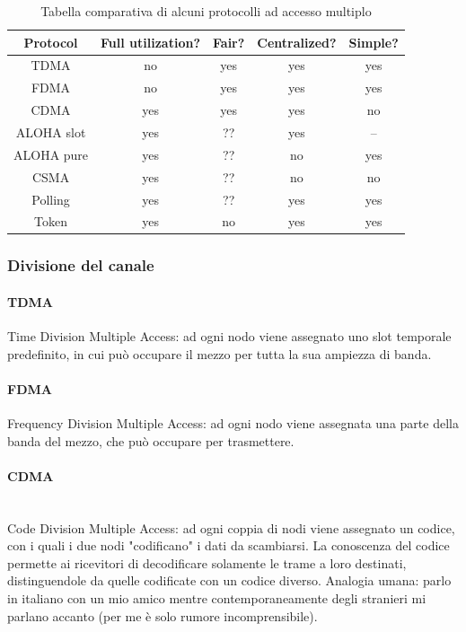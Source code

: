 \documentclass[12pt,a4paper]{article}
\begin{document}
\begin{table}[H]
  \centering
  \begin{tabular}{| c | c | c | c | c |}
  \hline
  Protocol    & Full utilization? & Fair? & Centralized?  & Simple? \\ \hline
  TDMA        & no                & yes   & yes           & yes     \\ \hline
  FDMA        & no                & yes   & yes           & yes     \\ \hline
  CDMA        & yes               & yes   & yes           & no      \\ \hline
  ALOHA slot  & yes               & ??    & yes           & --      \\ \hline
  ALOHA pure  & yes               & ??    & no            & yes     \\ \hline
  CSMA        & yes               & ??    & no            & no      \\ \hline
  Polling     & yes               & ??    & yes           & yes     \\ \hline
  Token       & yes               & no    & yes           & yes     \\ \hline
  \end{tabular}
  \caption{Tabella comparativa di alcuni protocolli ad accesso multiplo}
\end{table}

\subsubsection{Divisione del canale}
\paragraph{TDMA}
  Time Division Multiple Access: ad ogni nodo viene assegnato uno slot
  temporale predefinito, in cui può occupare il mezzo per tutta la sua
  ampiezza di banda.
\paragraph{FDMA}
  Frequency Division Multiple Access: ad ogni nodo viene assegnata una
  parte della banda del mezzo, che può occupare per trasmettere.
\paragraph{CDMA}\mbox{}\\
  Code Division Multiple Access: ad ogni coppia di nodi viene assegnato
  un codice, con i quali i due nodi "codificano" i dati da scambiarsi.
  La conoscenza del codice permette ai ricevitori di decodificare
  solamente le trame a loro destinati, distinguendole da quelle
  codificate con un codice diverso. Analogia umana: parlo in italiano
  con un mio amico mentre contemporaneamente degli stranieri mi parlano
  accanto (per me è solo rumore incomprensibile).
\end{document}
